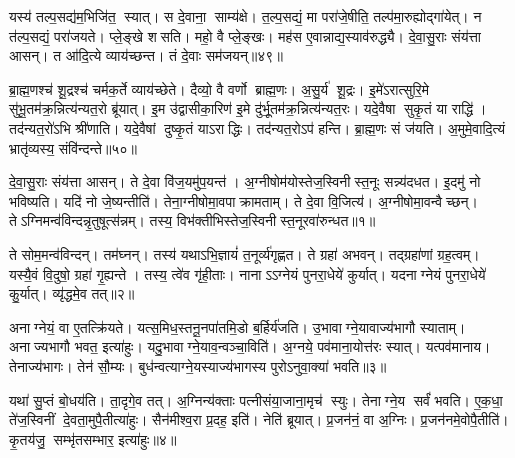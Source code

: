 यस्य॑ तल्प॒सद्य॑म॒भिजि॑त॒ स्यात्।
स दे॒वाना॒ साम्य॑क्षे।
त॒ल्प॒सद्यं॒ मा परा॑जे॒षीति॒ तल्प॑मा॒रुह्योद्गा॑येत्।
न त॑ल्प॒सद्यं॒ परा॑जयते।
प्ले॒ङ्खे शसति।
महो॒ वै प्ले॒ङ्खः।
मह॑स ए॒वान्नाद्य॒स्याव॑रुद्ध्यै।
दे॒वा॒सु॒राः संय॑त्ता आसन्।
त आ॑दि॒त्ये व्याय॑च्छन्त।
तं दे॒वाः सम॑जयन्॥४९॥

ब्रा॒ह्म॒णश्च॑ शू॒द्रश्च॑ चर्मक॒र्ते व्याय॑च्छेते।
दैव्यो॒ वै वर्णो ब्राह्म॒णः।
अ॒सु॒र्य॑ शू॒द्रः।
इ॒मे॑ऽरात्सुरि॒मे सु॑भू॒तम॑क्र॒न्नित्य॑न्यत॒रो ब्रू॑यात्।
इ॒म उ॑द्वासीका॒रिण॑ इ॒मे दु॑र्भू॒तम॑क्र॒न्नित्य॑न्यत॒रः।
यदे॒वैषा सुकृ॒तं या राद्धि॑।
तद॑न्यत॒रो॑ऽभि श्री॑णाति।
यदे॒वैषां दुष्कृ॒तं याऽराद्धिः।
तद॑न्यत॒रोऽप॑ हन्ति।
ब्रा॒ह्म॒णः सं ज॑यति।
अ॒मुमे॒वादि॒त्यं भ्रातृ॑व्यस्य॒ संवि॑न्दन्ते॥५०॥




\clearpage
{}
\setcounter{anuvakam}{0}

दे॒वा॒सु॒राः संय॑त्ता आसन्।
ते दे॒वा वि॑ज॒यमु॑प॒यन्त॑।
अ॒ग्नीषोम॑योस्तेज॒स्विनीस्त॒नूः सन्न्य॑दधत।
इ॒दमु॑ नो भविष्यति।
यदि॑ नो जे॒ष्यन्तीति॑।
तेना॒ग्नीषोमा॒वपाक्रामताम्।
ते दे॒वा वि॒जित्य॑।
अ॒ग्नीषोमा॒वन्वैच्छन्।
तेऽग्निमन्व॑\-विन्दन्नृ॒तुषूत्स॑न्नम्।
तस्य॒ विभ॑क्तीभिस्तेज॒स्विनीस्त॒नू\-रवा॑रुन्धत॥१॥

ते सोम॒मन्व॑विन्दन्।
तम॑घ्नन्।
तस्य॑ यथाऽभि॒ज्ञायं॑ त॒नूर्व्य॑गृह्णत।
ते ग्रहा॑ अभवन्।
तद्ग्रहा॑णां ग्रह॒त्वम्।
यस्यै॒वं वि॒दुषो॒ ग्रहा॑ गृ॒ह्यन्ते।
तस्य॒ त्वे॑व गृ॑ही॒ताः।
नानाऽऽग्नेयं पुनरा॒धेये॑ कुर्यात्।
यदनाग्नेयं पुनरा॒धेये॑ कु॒र्यात्।
व्यृ॑द्धमे॒व तत्॥२॥

अनाग्नेयं॒ वा ए॒तत्क्रि॑यते।
यत्स॒मिध॒स्तनू॒नपा॑तमि॒डो ब॒र्\mbox{}हिर्य॑जति।
उ॒भावाग्ने॒यावाज्य॑भागौ स्याताम्।
अनाज्यभागौ भवत॒ इत्या॑हुः।
यदु॒भावाग्ने॒याव॒न्वञ्चा॒विति॑।
अ॒ग्नये॒ पव॑माना॒योत्त॑रः स्यात्।
यत्पव॑मानाय।
तेनाज्य॑भागः।
तेन॑ सौ॒म्यः।
बुध॑न्वत्याग्ने॒यस्याज्य॑भागस्य पुरोऽनुवा॒क्या॑ भवति॥३॥

यथा॑ सु॒प्तं बो॒धय॑ति।
ता॒दृगे॒व तत्।
अ॒ग्निन्य॑क्ताः पत्नीसंया॒जाना॒मृच॑ स्युः।
तेनाग्ने॒य सर्वं॑ भवति।
ए॒क॒धा॒ ते॑ज॒स्विनीं दे॒वता॒मुपै॒तीत्या॑हुः।
सैन॑मीश्व॒रा प्र॒दह॒ इति॑।
नेति॑ ब्रूयात्।
प्र॒जन॑नं॒ वा अ॒ग्निः।
प्र॒जन॑नमे॒वोपै॒तीति॑।
कृ॒तय॑जु॒ सम्भृ॑तसम्भार॒ इत्या॑हुः॥४॥

